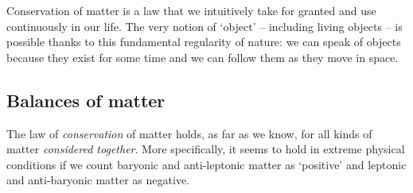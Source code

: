\documentclass[a4paper,12pt,%
onecolumn,oneside,titlepage,%
british%
]{memoir}
\newcommand*{\defd}{\coloneqq}
\renewcommand*{\|}[1][]{\nonscript\:#1\vert\nonscript\:\mathopen{}}
\newcommand*{\yN}{N}
\newcommand*{\yJ}{J}
\begin{document}
Conservation of matter is a law that we intuitively take for granted and use continuously in our life. The very notion of \enquote*{object} -- including living objects -- is possible thanks to this fundamental regularity of nature: we can speak of objects because they exist for some time and we can follow them as they move in space. %


\subsection{Balances of matter}
\label{nsec:matter_balances}

The law of \emph{conservation} of matter holds, as far as we know, for all kinds of matter \emph{considered together}. %
More specifically, it seems to hold in extreme physical conditions if we count baryonic and anti-leptonic matter as \enquote*{positive} and leptonic and anti-baryonic matter as negative.
\end{document}
